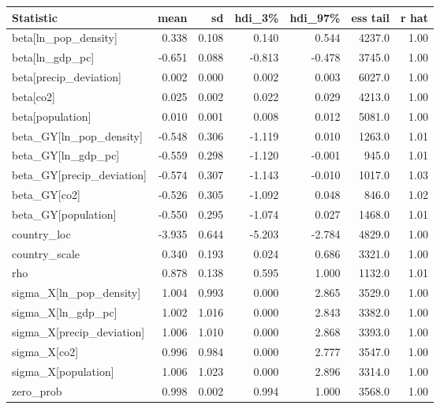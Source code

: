 \begin{table}[H]
\centering
{}
\label{tab:event_frequency_results_2}
\footnotesize
\begin{tabular}{lrrrrrr}
\toprule
\textbf{Statistic} & \textbf{mean} & \textbf{sd} & \textbf{hdi\_3\%} & \textbf{hdi\_97\%} & \textbf{ess tail} & \textbf{r hat} \\
\midrule
beta[ln\_pop\_density] & 0.338 & 0.108 & 0.140 & 0.544 & 4237.0 & 1.00 \\
beta[ln\_gdp\_pc] & -0.651 & 0.088 & -0.813 & -0.478 & 3745.0 & 1.00 \\
beta[precip\_deviation] & 0.002 & 0.000 & 0.002 & 0.003 & 6027.0 & 1.00 \\
beta[co2] & 0.025 & 0.002 & 0.022 & 0.029 & 4213.0 & 1.00 \\
beta[population] & 0.010 & 0.001 & 0.008 & 0.012 & 5081.0 & 1.00 \\
beta\_GY[ln\_pop\_density] & -0.548 & 0.306 & -1.119 & 0.010 & 1263.0 & 1.01 \\
beta\_GY[ln\_gdp\_pc] & -0.559 & 0.298 & -1.120 & -0.001 & 945.0 & 1.01 \\
beta\_GY[precip\_deviation] & -0.574 & 0.307 & -1.143 & -0.010 & 1017.0 & 1.03 \\
beta\_GY[co2] & -0.526 & 0.305 & -1.092 & 0.048 & 846.0 & 1.02 \\
beta\_GY[population] & -0.550 & 0.295 & -1.074 & 0.027 & 1468.0 & 1.01 \\
country\_loc & -3.935 & 0.644 & -5.203 & -2.784 & 4829.0 & 1.00 \\
country\_scale & 0.340 & 0.193 & 0.024 & 0.686 & 3321.0 & 1.00 \\
rho & 0.878 & 0.138 & 0.595 & 1.000 & 1132.0 & 1.01 \\
sigma\_X[ln\_pop\_density] & 1.004 & 0.993 & 0.000 & 2.865 & 3529.0 & 1.00 \\
sigma\_X[ln\_gdp\_pc] & 1.002 & 1.016 & 0.000 & 2.843 & 3382.0 & 1.00 \\
sigma\_X[precip\_deviation] & 1.006 & 1.010 & 0.000 & 2.868 & 3393.0 & 1.00 \\
sigma\_X[co2] & 0.996 & 0.984 & 0.000 & 2.777 & 3547.0 & 1.00 \\
sigma\_X[population] & 1.006 & 1.023 & 0.000 & 2.896 & 3314.0 & 1.00 \\
zero\_prob & 0.998 & 0.002 & 0.994 & 1.000 & 3568.0 & 1.00 \\
\bottomrule
\end{tabular}
\end{table}
